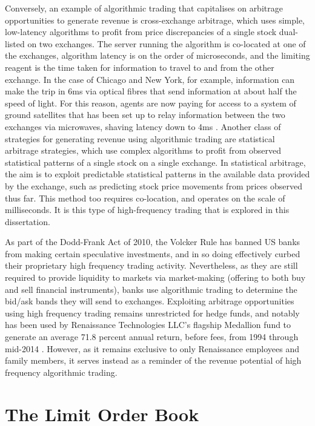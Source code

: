 Conversely, an example of algorithmic trading that capitalises on arbitrage opportunities to generate revenue is cross-exchange arbitrage, which uses simple, low-latency algorithms to profit from price discrepancies of a single stock dual-listed on two exchanges. The server running the algorithm is co-located at one of the exchanges, algorithm latency is on the order of microseconds, and the limiting reagent is the time taken for information to travel to and from the other exchange. In the case of Chicago and New York, for example, information can make the trip in 6ms via optical fibres that send information at about half the speed of light. For this reason, agents are now paying for access to a system of ground satellites that has been set up to relay information between the two exchanges via microwaves, shaving latency down to 4ms \citep{Laughlin14}. Another class of strategies for generating revenue using algorithmic trading are statistical arbitrage strategies, which use complex algorithms to profit from observed statistical patterns of a single stock on a single exchange. In statistical arbitrage, the aim is to exploit predictable statistical patterns in the available data provided by the exchange, such as predicting stock price movements from prices observed thus far. This method too requires co-location, and operates on the scale of milliseconds. It is this type of high-frequency trading that is explored in this dissertation. 

As part of the Dodd-Frank Act of 2010, the Volcker Rule has banned US banks from making certain speculative investments, and in so doing effectively curbed their proprietary high frequency trading activity. Nevertheless, as they are still required to provide liquidity to markets via market-making (offering to both buy and sell financial instruments), banks use algorithmic trading to determine the bid/ask bands they will send to exchanges. Exploiting arbitrage opportunities using high frequency trading remains unrestricted for hedge funds, and notably has been used by Renaissance Technologies LLC's flagship Medallion fund to generate an average 71.8 percent annual return, before fees, from 1994 through mid-2014 \citep{rentech}. However, as it remains exclusive to only Renaissance employees and family members, it serves instead as a reminder of the revenue potential of high frequency algorithmic trading.

\section{The Limit Order Book}

